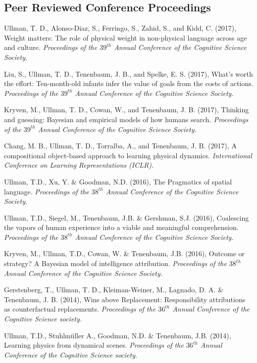 \documentclass[margin,line,pifont,palatino,courier]{res}
\begin{document}
\begin{resume}
\section{\sc Peer Reviewed Conference Proceedings}

Ullman, T. D., Alonso-Diaz, S., Ferringo, S., Zahid, S., and Kidd, C. (2017), Weight matters: The role of physical weight in non-physical language across age and culture. \textit{Proceedings of the $39^{th}$ Annual Conference of the Cognitive Science Society.}

Liu, S., Ullman, T. D., Tenenbaum, J. B., and Spelke, E. S. (2017), What's worth the effort: Ten-month-old infants infer the value of goals from the costs of actions. \textit{Proceedings of the $39^{th}$ Annual Conference of the Cognitive Science Society.}

Kryven, M., Ullman, T. D., Cowan, W., and Tenenbaum, J. B. (2017), Thinking and guessing: Bayesian and empirical models of how humans search. \textit{Proceedings of the $39^{th}$ Annual Conference of the Cognitive Science Society.}

Chang, M. B., Ullman, T. D., Torralba, A., and Tenenbaum, J. B. (2017), A compositional object-based approach to learning physical dynamics. \textit{International Conference on Learning Representations (ICLR).}

Ullman, T.D., Xu, Y. \& Goodman, N.D. (2016), The Pragmatics of spatial language. \textit{Proceedings of the $38^{th}$ Annual Conference of the Cognitive Science Society.}

Ullman, T.D., Siegel, M., Tenenbaum, J.B. \& Gershman, S.J. (2016), Coalescing the vapors of human experience into a viable and meaningful comprehension. \textit{Proceedings of the $38^{th}$ Annual Conference of the Cognitive Science Society.}

Kryven, M., Ullman, T.D., Cowan, W. \& Tenenbaum, J.B. (2016), Outcome or strategy? A Bayesian model of intelligence attribution. \textit{Proceedings of the $38^{th}$ Annual Conference of the Cognitive Science Society.}

Gerstenberg, T., Ullman, T. D., Kleiman-Weiner, M., Lagnado, D. A. \& Tenenbaum, J. B. (2014), Wins above Replacement: Responsibility attributions as counterfactual replacements. \textit{Proceedings of the $36^{th}$ Annual Conference of the Cognitive Science society.}

Ullman, T.D., Stuhlm{\"u}ller A., Goodman, N.D. \& Tenenbaum, J.B. (2014), Learning physics from dynamical scenes. \textit{Proceedings of the $36^{th}$ Annual Conference of the Cognitive Science society.}


\end{resume}
\end{document}
